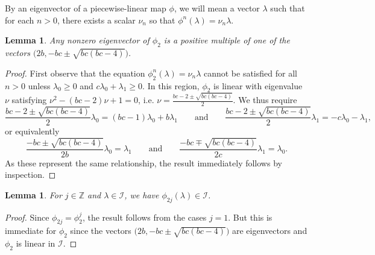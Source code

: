 \documentclass{amsart}
\newtheorem{lemma}[theorem]{Lemma}
\numberwithin{theorem}{section}
\newcommand{\cI}{\mathcal{I}}
\newcommand{\ZZ}{\mathbb{Z}}
\begin{document}
  By an eigenvector of a piecewise-linear map $\phi$, we will mean a vector $\lambda$ such that for each $n>0$, there exists a scalar $\nu_n$ so that $\phi^n(\lambda)=\nu_n\lambda$.
  \begin{lemma}
    Any nonzero eigenvector of $\phi_2$ is a positive multiple of one of the vectors $\big(2b,-bc\pm\sqrt{bc(bc-4)}\big)$.
  \end{lemma}
  \begin{proof}
    First observe that the equation $\phi_2^n(\lambda)=\nu_n\lambda$ cannot be satisfied for all $n>0$ unless $\lambda_0\ge 0$ and $c\lambda_0+\lambda_1\ge 0$.
    In this region, $\phi_2$ is linear with eigenvalue $\nu$ satisfying $\nu^2-(bc-2)\nu+1=0$, i.e. $\nu=\frac{bc-2\pm\sqrt{bc(bc-4)}}{2}$.
    We thus require 
    \[\frac{bc-2\pm\sqrt{bc(bc-4)}}{2}\lambda_0=(bc-1)\lambda_0+b\lambda_1 \qquad\text{and}\qquad \frac{bc-2\pm\sqrt{bc(bc-4)}}{2}\lambda_1= -c\lambda_0-\lambda_1,\]
    or equivalently
    \[\frac{-bc\pm\sqrt{bc(bc-4)}}{2b}\lambda_0=\lambda_1 \qquad\text{and}\qquad \frac{-bc\mp\sqrt{bc(bc-4)}}{2c}\lambda_1=\lambda_0.\]
    As these represent the same relationship, the result immediately follows by inspection.
  \end{proof}

  \begin{lemma}
    \label{le:imaginary stability}
    For $j\in\ZZ$ and $\lambda\in\cI$, we have $\phi_{2j}(\lambda)\in\cI$.
  \end{lemma}
  \begin{proof}
    Since $\phi_{2j}=\phi_2^j$, the result follows from the cases $j=1$.
    But this is immediate for $\phi_2$ since the vectors $\big(2b,-bc\pm\sqrt{bc(bc-4)}\big)$ are eigenvectors and $\phi_2$ is linear in $\cI$.
  \end{proof}
\end{document}
